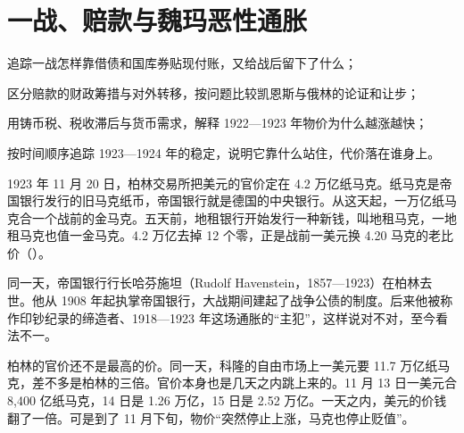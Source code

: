 \chapter{一战、赔款与魏玛恶性通胀}\label{ch:weimar}

\begin{chapterguide}
\begin{guidegoals}
\item 追踪一战怎样靠借债和国库券贴现付账，又给战后留下了什么；
\item 区分赔款的财政筹措与对外转移，按问题比较凯恩斯与俄林的论证和让步；
\item 用铸币税、税收滞后与货币需求，解释 1922—1923 年物价为什么越涨越快；
\item 按时间顺序追踪 1923—1924 年的稳定，说明它靠什么站住，代价落在谁身上。
\end{guidegoals}
\end{chapterguide}

1923 年 11 月 20 日，柏林交易所把美元的官价定在 4.2 万亿纸马克。纸马克是帝国银行发行的旧马克纸币，帝国银行就是德国的中央银行。从这天起，一万亿纸马克合一个战前的金马克\cite{bresciani1937}。五天前，地租银行开始发行一种新钱，叫地租马克，一地租马克也值一金马克\cite{bundesarchiv1923,bresciani1937}。4.2 万亿去掉 12 个零，正是战前一美元换 4.20 马克的老比价（）。

同一天，帝国银行行长哈芬施坦（Rudolf Havenstein，1857—1923）在柏林去世。他从 1908 年起执掌帝国银行，大战期间建起了战争公债的制度。后来他被称作印钞纪录的缔造者、1918—1923 年这场通胀的“主犯”，这样说对不对，至今看法不一\cite{havenstein1969}。

柏林的官价还不是最高的价。同一天，科隆的自由市场上一美元要 11.7 万亿纸马克，差不多是柏林的三倍。官价本身也是几天之内跳上来的。11 月 13 日一美元合 8,400 亿纸马克，14 日是 1.26 万亿，15 日是 2.52 万亿。一天之内，美元的价钱翻了一倍\cite{bresciani1937}。可是到了 11 月下旬，物价“突然停止上涨，马克也停止贬值”\cite{sargent1982}。

